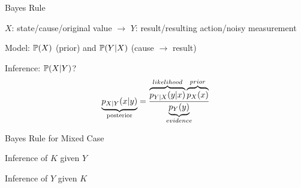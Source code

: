 \documentclass[handout,fleqn,aspectratio=169]{beamer}
\begin{document}
\begin{frame}{Bayes Rule}

\plitemsep 0.04in
\bci 

\item<1-> $X$: state/cause/original value $\rightarrow$ $Y$: result/resulting action/noisy measurement

\item<1-> Model: $\mathbb{P}( X )$ (prior) and $\mathbb{P}( Y | X )$ (cause $\rightarrow$ result)

\item<1-> Inference: $\mathbb{P}( X | Y )$?
 {
\vspace{-0.2cm}
}
{
\vspace{-0.2cm}
}
\vspace{-0.4cm}
$$
\underbrace{p_{X|Y}(x|y)}_{\text{posterior}}  = \frac{\overbrace{p_{Y|X}(y|x)}^{likelihood} \overbrace{p_X(x)}^{prior}}{\underbrace{p_Y(y)}_{evidence}}
$$
\eci 
\end{frame}

\begin{frame}{Bayes Rule for Mixed Case}


\bigskip

\plitemsep 0.1in
{
\bci 

\item<2-> Inference of $K$ given $Y$
\eci
}
{
\bci 

\item<2-> Inference of $Y$ given $K$
\eci 
}

\end{frame}



\end{document}
